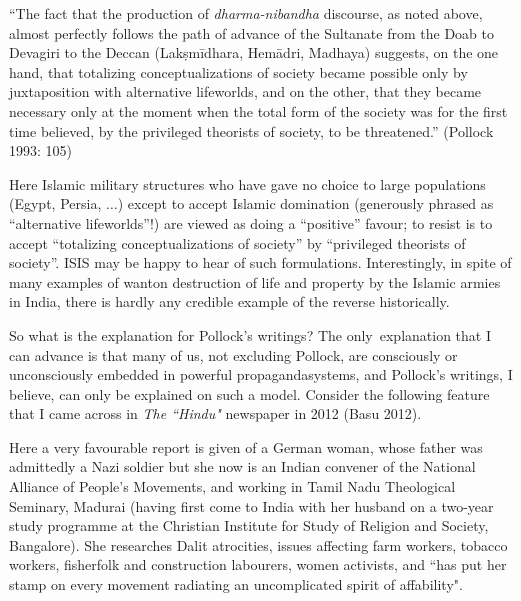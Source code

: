\begin{myquote}
“The fact that the production of {\sl dharma-nibandha} discourse, as noted above, almost perfectly follows the path of advance of the Sultanate from the Doab to Devagiri to the Deccan (Lakṣmīdhara, Hemādri, Madhaya) suggests, on the one hand, that totalizing conceptualizations of society became possible only by juxtaposition with alternative lifeworlds, and on the other, that they became necessary only at the moment when the total form of the society was for the first time believed, by the privileged theorists of society, to be threatened.” 
\hfill(Pollock 1993: 105)
\end{myquote}

Here Islamic military structures who have gave no choice to large populations (Egypt, Persia, $\ldots$) except to accept Islamic domination (generously phrased as “alternative lifeworlds”!) are viewed as doing a “positive” favour; to resist is to accept “totalizing conceptualizations of society” by “privileged theorists of society”. ISIS may be happy to hear of such formulations. Interestingly, in spite of many examples of wanton destruction of life and property by the Islamic armies in India, there is hardly any credible example of the reverse historically. 

So what is the explanation for Pollock's writings? The only~explanation that I can advance is that many of us, not excluding Pollock, are consciously or unconsciously embedded in powerful propaganda\break systems, and Pollock’s writings, I believe, can only be explained on such a model.  Consider the following feature that I came across in {\sl The ``Hindu"} newspaper in 2012 (Basu 2012).

Here a very favourable report is given of a German woman, whose father was admittedly a Nazi soldier but she now is an Indian convener of the National Alliance of People's Movements, and working in Tamil Nadu Theological Seminary, Madurai (having first come to India with her husband on a two-year study programme at the Christian Institute for Study of Religion and Society, Bangalore). She researches Dalit atrocities, issues affecting farm workers, tobacco workers, fisherfolk and construction labourers, women activists, and ``has put her stamp on every movement radiating an uncomplicated spirit of affability".

